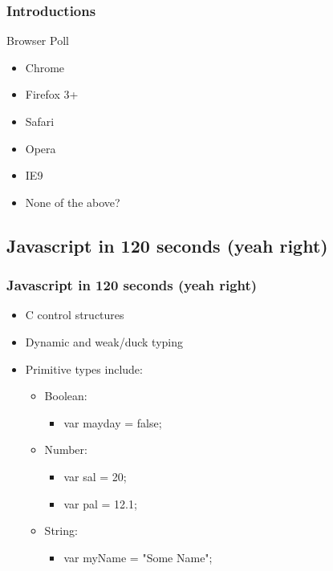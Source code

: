 \documentclass{beamer}
\begin{document}
\begin{frame}
    \frametitle{Introductions}
\pause
    \begin{block}{Browser Poll}
        \begin{itemize}
\pause
        \item Chrome
\pause
        \item Firefox 3+
\pause
        \item Safari
\pause
        \item Opera
\pause        
        \item IE9
\pause
        \item None of the above?
        \end{itemize}
    \end{block}
\end{frame}


\subsection{Javascript in 120 seconds (yeah right)}


\begin{frame}
    \frametitle{Javascript in 120 seconds (yeah right)}
    \begin{itemize}
\pause
    \item C control structures
\pause
    \item Dynamic and weak/duck typing
\pause
    \item Primitive types include:
\pause
        \begin{itemize}
        \item Boolean: 
            \begin{itemize}
            \item var mayday = false;
            \end{itemize}
\pause
        \item Number: 
            \begin{itemize}
            \item var sal = 20; 
            \item var pal = 12.1;
            \end{itemize}
\pause
        \item String: 
            \begin{itemize}
            \item var myName = "Some Name";
            \end{itemize}
        \end{itemize}
    \end{itemize}
\end{frame}
\end{document}

